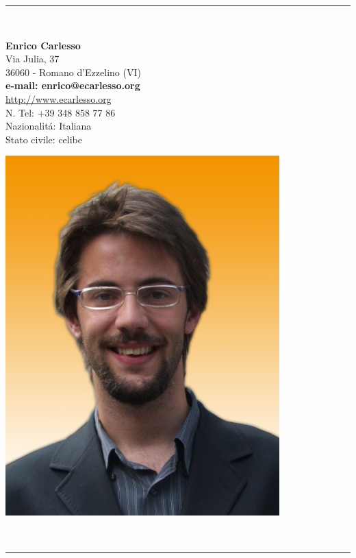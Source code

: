 \documentclass[pdftex, a4paper, 11pt]{article}
\begin{document}
\vspace*{.3cm}
\begin{center}
  \rule{.8\textwidth}{1pt}\\[10pt]
  \begin{minipage}{.55\textwidth}
    \LARGE\textbf{Enrico Carlesso}\\[13pt]
    \small Via Julia, 37\\
    36060 - Romano d'Ezzelino (VI)\\[6pt]
    \textbf{e-mail: enrico@ecarlesso.org}\\
    \small \url{http://www.ecarlesso.org}\\
    \small N. Tel: +39 348 858 77 86\\[6pt]
    \small Nazionalit\'a: Italiana\\
    \small Stato civile: celibe\\
  \end{minipage}
  \begin{minipage}{.2\textwidth}
    \includegraphics[width=\textwidth]{foto.png}
  \end{minipage}\\[5pt]
  \rule{.8\textwidth}{1pt}
\end{center}
\vspace*{1cm}
\end{document}
